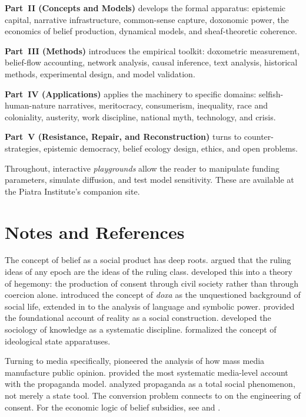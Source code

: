 \textbf{Part~II (Concepts and Models)} develops the formal apparatus: epistemic capital, narrative infrastructure, common-sense capture, doxonomic power, the economics of belief production, dynamical models, and sheaf-theoretic coherence.

\textbf{Part~III (Methods)} introduces the empirical toolkit: doxometric measurement, belief-flow accounting, network analysis, causal inference, text analysis, historical methods, experimental design, and model validation.

\textbf{Part~IV (Applications)} applies the machinery to specific domains: selfish-human-nature narratives, meritocracy, consumerism, inequality, race and coloniality, austerity, work discipline, national myth, technology, and crisis.

\textbf{Part~V (Resistance, Repair, and Reconstruction)} turns to counter-strategies, epistemic democracy, belief ecology design, ethics, and open problems.

Throughout, interactive \emph{playgrounds} allow the reader to manipulate funding parameters, simulate diffusion, and test model sensitivity.
These are available at the Piatra Institute's companion site.


\section{Notes and References}
\label{sec:ch1-notes}

The concept of belief as a social product has deep roots.
\textcite{marx1846} argued that the ruling ideas of any epoch are the ideas of the ruling class.
\textcite{gramsci1971} developed this into a theory of hegemony: the production of consent through civil society rather than through coercion alone.
\textcite{bourdieu1984} introduced the concept of \textit{doxa} as the unquestioned background of social life, extended in \textcite{bourdieu1991} to the analysis of language and symbolic power.
\textcite{berger1966} provided the foundational account of reality as a social construction.
\textcite{mannheim1936} developed the sociology of knowledge as a systematic discipline.
\textcite{althusser1970} formalized the concept of ideological state apparatuses.

Turning to media specifically, \textcite{lippmann1922} pioneered the analysis of how mass media manufacture public opinion.
\textcite{herman1988} provided the most systematic media-level account with the propaganda model.
\textcite{ellul1965} analyzed propaganda as a total social phenomenon, not merely a state tool.
The conversion problem connects to \textcite{bernays1928} on the engineering of consent.
For the economic logic of belief subsidies, see \textcite{coase1974} and \textcite{stigler1961}.

